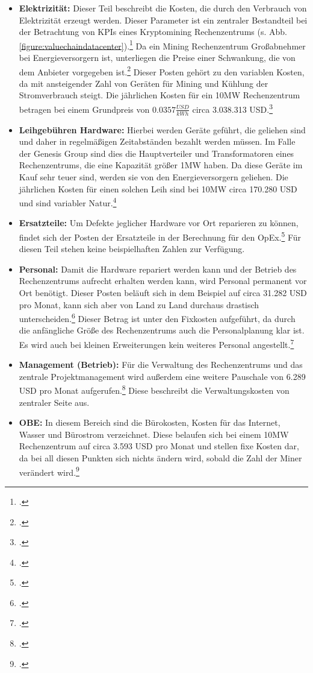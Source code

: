 \begin{itemize}
    \item \textbf{Elektrizität: }Dieser Teil beschreibt die Kosten, die durch den Verbrauch von Elektrizität erzeugt werden.
    Dieser Parameter ist ein zentraler Bestandteil bei der Betrachtung von \acp{KPI} eines Kryptomining Rechenzentrums
    (s. Abb. \ref{figure:valuechaindatacenter}).\footcite[Cf.][p. 327]{derks2018chaining} Da ein Mining Rechenzentrum
    Großabnehmer bei Energieversorgern ist, unterliegen die Preise einer Schwankung, die von dem Anbieter vorgegeben
    ist.\footcite[Cf.][]{appendix:opex} Dieser Posten gehört zu den variablen Kosten, da mit ansteigender Zahl von Geräten
    für Mining und Kühlung der Stromverbrauch steigt. Die jährlichen Kosten für ein 10MW Rechenzentrum betragen bei einem
    Grundpreis von $0.0357 \frac{USD}{kWh}$ circa 3.038.313 USD.\footcite[Cf.][]{appendix:opex}
    \item \textbf{Leihgebühren Hardware: }Hierbei werden Geräte geführt, die geliehen sind und daher in regelmäßigen
    Zeitabständen bezahlt werden müssen. Im Falle der Genesis Group sind dies die Hauptverteiler und Transformatoren
    eines Rechenzentrums, die eine Kapazität größer 1MW haben. Da diese Geräte im Kauf sehr teuer sind, werden sie von
    den Energieversorgern geliehen. Die jährlichen Kosten für einen solchen Leih sind bei 10MW circa 170.280 USD
    und sind variabler Natur.\footcite[Cf.][]{appendix:opex}
    \item \textbf{Ersatzteile: }Um Defekte jeglicher Hardware vor Ort reparieren zu können, findet sich der Posten der
    Ersatzteile in der Berechnung für den \ac{OpEx}.\footcite[Cf.][p. 327]{derks2018chaining} Für diesen Teil stehen
    keine beispielhaften Zahlen zur Verfügung.
    \item \textbf{Personal: }Damit die Hardware repariert werden kann und der Betrieb des Rechenzentrums aufrecht erhalten
    werden kann, wird Personal permanent vor Ort benötigt. Dieser Posten beläuft sich in dem Beispiel auf circa
    31.282 USD pro Monat, kann sich aber von Land zu Land durchaus drastisch unterscheiden.\footcite[Cf.][]{appendix:opex}
    Dieser Betrag ist unter den Fixkosten aufgeführt, da durch die anfängliche Größe des Rechenzentrums auch die Personalplanung
    klar ist. Es wird auch bei kleinen Erweiterungen kein weiteres Personal angestellt.\footcite[Cf.][]{appendix:opex}
    \item \textbf{Management (Betrieb): }Für die Verwaltung des Rechenzentrums und das zentrale Projektmanagement wird
    außerdem eine weitere Pauschale von 6.289 USD pro Monat aufgerufen.\footcite[Cf.][]{appendix:opex} Diese beschreibt
    die Verwaltungskosten von zentraler Seite aus.
    \item \textbf{\ac{OBE}: }In diesem Bereich sind die Bürokosten, Kosten für das Internet, Wasser und Bürostrom verzeichnet.
    Diese belaufen sich bei einem 10MW Rechenzentrum auf circa 3.593 USD pro Monat und stellen fixe Kosten dar, da bei all diesen
    Punkten sich nichts ändern wird, sobald die Zahl der Miner verändert wird.\footcite[Cf.][]{appendix:opex}
\end{itemize}

